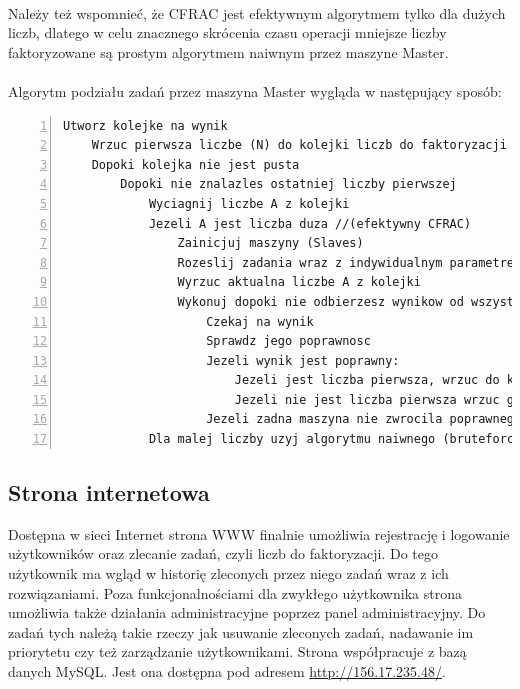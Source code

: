 \documentclass{article}
\begin{document}
\paragraph{}Należy też wspomnieć, że CFRAC jest efektywnym algorytmem tylko dla dużych liczb, dlatego w celu znacznego skrócenia czasu operacji mniejsze liczby faktoryzowane są prostym algorytmem naiwnym przez maszyne Master.

\paragraph{}Algorytm podziału zadań przez maszyna Master wygląda w następujący sposób:

\begin{lstlisting}[caption=Sekwencja instrukcji algorytmu CFRAC,numbers=left]
    Utworz kolejke na wynik
    Wrzuc pierwsza liczbe (N) do kolejki liczb do faktoryzacji
    Dopoki kolejka nie jest pusta 
        Dopoki nie znalazles ostatniej liczby pierwszej
            Wyciagnij liczbe A z kolejki 
            Jezeli A jest liczba duza //(efektywny CFRAC) 
                Zainicjuj maszyny (Slaves) 
                Rozeslij zadania wraz z indywidualnym parametrem K 
                Wyrzuc aktualna liczbe A z kolejki 
                Wykonuj dopoki nie odbierzesz wynikow od wszystkich maszyn 
                    Czekaj na wynik 
                    Sprawdz jego poprawnosc 
                    Jezeli wynik jest poprawny: 
                        Jezeli jest liczba pierwsza, wrzuc do kolejki wynikow
                        Jezeli nie jest liczba pierwsza wrzuc go oraz jego iloraz z liczba A do kolejki liczb do faktoryzacji 
                    Jezeli zadna maszyna nie zwrocila poprawnego wyniku, zmien parametr k i wrzuc z powrotem liczbe A do kolejki liczb do faktoryzacji 
            Dla malej liczby uzyj algorytmu naiwnego (bruteforce)
\end{lstlisting}

\subsection{Strona internetowa}

Dostępna w sieci Internet strona WWW finalnie umożliwia rejestrację i logowanie użytkowników oraz zlecanie zadań, czyli liczb do faktoryzacji. Do tego użytkownik ma wgląd w historię zleconych przez niego zadań wraz z ich rozwiązaniami. Poza funkcjonalnościami dla zwykłego użytkownika strona umożliwia także działania administracyjne poprzez panel administracyjny. Do zadań tych należą takie rzeczy jak usuwanie zleconych zadań, nadawanie im priorytetu czy też zarządzanie użytkownikami. Strona współpracuje z bazą danych MySQL. Jest ona dostępna pod adresem \url{http://156.17.235.48/}.
\end{document}
